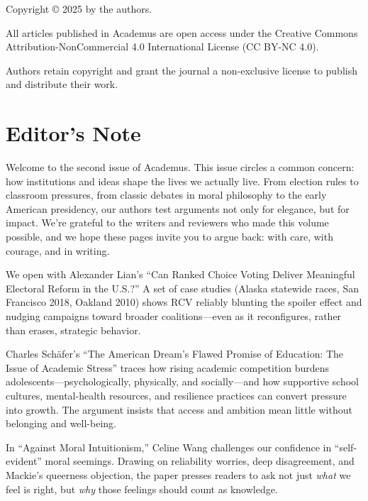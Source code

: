 \documentclass[12pt, a4paper, openany]{book}
\begin{document}
\frontmatter

\vspace*{\fill}
\begin{center}
Copyright © 2025 by the authors.

All articles published in Academus are open access under the Creative Commons Attribution-NonCommercial 4.0 International License (CC BY-NC 4.0).

Authors retain copyright and grant the journal a non-exclusive license to publish and distribute their work.
\end{center}

\vspace*{\fill}

\chapter{Editor's Note}

Welcome to the second issue of Academus. This issue circles a common concern: how institutions and ideas shape the lives we actually live. From election rules to classroom pressures, from classic debates in moral philosophy to the early American presidency, our authors test arguments not only for elegance, but for impact. We’re grateful to the writers and reviewers who made this volume possible, and we hope these pages invite you to argue back: with care, with courage, and in writing.

We open with Alexander Lian’s “Can Ranked Choice Voting Deliver Meaningful Electoral Reform in the U.S.?” A set of case studies (Alaska statewide races, San Francisco 2018, Oakland 2010) shows RCV reliably blunting the spoiler effect and nudging campaigns toward broader coalitions—even as it reconfigures, rather than erases, strategic behavior.

Charles Schäfer’s “The American Dream’s Flawed Promise of Education: The Issue of Academic Stress” traces how rising academic competition burdens adolescents—psychologically, physically, and socially—and how supportive school cultures, mental-health resources, and resilience practices can convert pressure into growth. The argument insists that access and ambition mean little without belonging and well-being.

In “Against Moral Intuitionism,” Celine Wang challenges our confidence in “self-evident” moral seemings. Drawing on reliability worries, deep disagreement, and Mackie’s queerness objection, the paper presses readers to ask not just \emph{what} we feel is right, but \emph{why} those feelings should count as knowledge.
\end{document}
